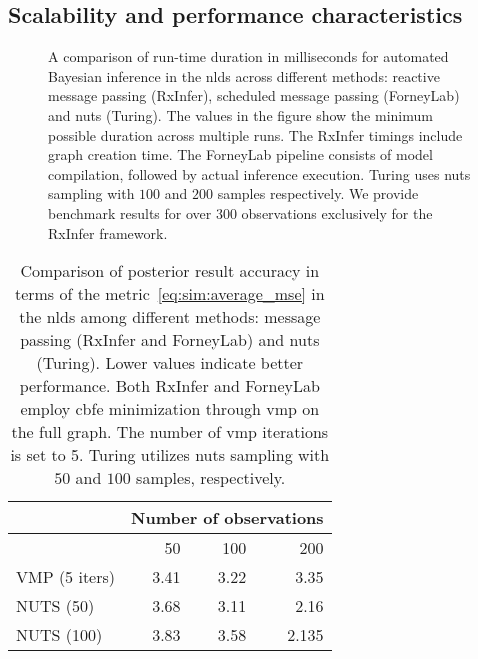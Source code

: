 \subsection{Scalability and performance characteristics}

\begin{figure}
  \centering
  \caption{A comparison of run-time duration in milliseconds for automated Bayesian inference in the \ac{nlds} across different methods: reactive message passing (RxInfer), scheduled message passing (ForneyLab) and \ac{nuts} (Turing).
    The values in the figure show the minimum possible duration across multiple runs.
    The RxInfer timings include graph creation time.
    The ForneyLab pipeline consists of model compilation, followed by actual inference execution.
    Turing uses \ac{nuts} sampling with $100$ and $200$ samples respectively.
    We provide benchmark results for over $300$ observations exclusively for the RxInfer
    framework.
  }
  \label{fig:sim:nlds_performance_comparison}
\end{figure}

\begin{table}
  \centering
  \begin{tabular}{ |l||r|r|r| }
    \hline
                  & \multicolumn{3}{|c|}{Number of observations}                \\
    \hline
                  & 50                                           & 100  & 200   \\
    \hline
    VMP (5 iters) & 3.41                                         & 3.22 & 3.35  \\
    \hline
    NUTS (50)     & 3.68                                         & 3.11 & 2.16  \\
    NUTS (100)    & 3.83                                         & 3.58 & 2.135 \\
    \hline
  \end{tabular}
  \caption{
    Comparison of posterior result accuracy in terms of the metric~\eqref{eq:sim:average_mse} in the \ac{nlds} among different methods: message passing (RxInfer and ForneyLab) and \ac{nuts} (Turing).
    Lower values indicate better performance.
    Both RxInfer and ForneyLab employ \ac{cbfe} minimization through \ac{vmp} on the full graph.
    The number of \ac{vmp} iterations is set to 5.
    Turing utilizes \ac{nuts} sampling with $50$ and $100$ samples, respectively.
  }
  \label{table:sim:nlds_accuracy_comparison}
\end{table}

